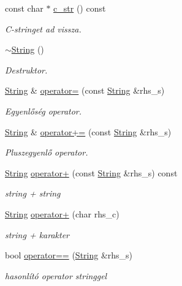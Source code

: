 \begin{DoxyCompactItemize}
const char $\ast$ \mbox{\hyperlink{class_string_a0274f3e61533d15086816fb7f47ccb54}{c\+\_\+str}} () const
\begin{DoxyCompactList}\small\item\em C-\/stringet ad vissza. \end{DoxyCompactList}\item 
\mbox{\hyperlink{class_string_ac40b2a3fb58c2d8556f5e6ff73510036}{$\sim$\+String}} ()
\begin{DoxyCompactList}\small\item\em Destruktor. \end{DoxyCompactList}\item 
\mbox{\hyperlink{class_string}{String}} \& \mbox{\hyperlink{class_string_a803e6112834d4c0cdb0da6c6a4000e6e}{operator=}} (const \mbox{\hyperlink{class_string}{String}} \&rhs\+\_\+s)
\begin{DoxyCompactList}\small\item\em Egyenlőség operator. \end{DoxyCompactList}\item 
\mbox{\hyperlink{class_string}{String}} \& \mbox{\hyperlink{class_string_ac203e7c52e04bb86f62f9dd75527b361}{operator+=}} (const \mbox{\hyperlink{class_string}{String}} \&rhs\+\_\+s)
\begin{DoxyCompactList}\small\item\em Pluszegyenlő operator. \end{DoxyCompactList}\item 
\mbox{\hyperlink{class_string}{String}} \mbox{\hyperlink{class_string_a28a020f061e5f25317af47488bfb7de8}{operator+}} (const \mbox{\hyperlink{class_string}{String}} \&rhs\+\_\+s) const
\begin{DoxyCompactList}\small\item\em string + string \end{DoxyCompactList}\item 
\mbox{\hyperlink{class_string}{String}} \mbox{\hyperlink{class_string_afa169686af6b513e1f059cf2bf39695f}{operator+}} (char rhs\+\_\+c)
\begin{DoxyCompactList}\small\item\em string + karakter \end{DoxyCompactList}\item 
bool \mbox{\hyperlink{class_string_a1006dbb8a123aed87b8edb33d5cbcee4}{operator==}} (\mbox{\hyperlink{class_string}{String}} \&rhs\+\_\+s)
\begin{DoxyCompactList}\small\item\em hasonlító operator stringgel \end{DoxyCompactList}\item 

\end{DoxyCompactItemize}
